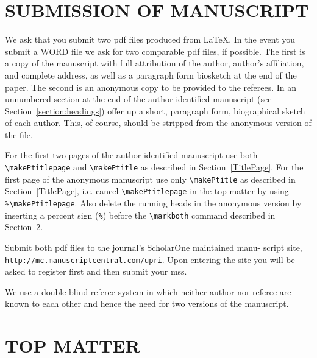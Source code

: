\documentclass{primus}
\begin{document}
\section{SUBMISSION OF MANUSCRIPT\label{submit} }

We ask that you submit two pdf files produced from \LaTeX. In the event you submit a WORD file we ask for two comparable pdf files, if possible.  The first is a copy of the manuscript with full attribution of the author, author's affiliation, and complete address, as well as a paragraph form biosketch at the end of the paper. The second is an anonymous copy to be provided to the referees. In an unnumbered section at the end of the author identified manuscript (see Section~\ref{section:headings}) offer up a short, paragraph form, biographical sketch of each author. This, of course, should be stripped  from the anonymous version of the file.

For the first two pages of the author identified manuscript use both \verb|\makePtitlepage| and \verb|\makePtitle| as described in Section~\ref{TitlePage}.   For the first page of the anonymous manuscript use only \verb|\makePtitle| as described in Section~\ref{TitlePage}, i.e. cancel \verb|\makePtitlepage| in the top matter by using \verb|%\makePtitlepage|. Also delete the running heads in the anonymous version by inserting a percent sign (\verb|%|) before the \verb|\markboth| command described in Section~\ref{topmatter}.

Submit both pdf files to the journal's ScholarOne maintained manu- \linebreak script site, {\tt http://mc.manuscriptcentral.com/upri}.  Upon entering the site you will be asked to register first and then submit your mss.

We use a double blind referee system in which neither author nor referee are known to each other and hence the need for two versions of the manuscript.


\section{TOP MATTER}\label{topmatter}
\end{document}
